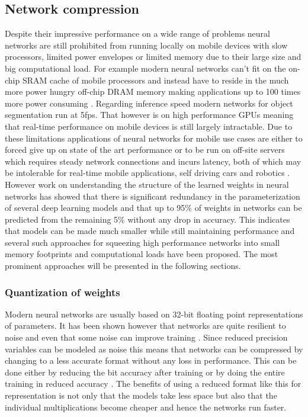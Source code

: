 \documentclass{kththesis}
\newcommand{\bibentry}[1]{\parencite{#1}}
\begin{document}
  \subsection{Network compression}
Despite their impressive performance on a wide range of problems neural networks
are still prohibited from running locally on mobile devices with slow
processors, limited power envelopes or limited memory due to their large size
and big computational load. For example modern neural networks can't fit on the
on-chip SRAM cache of mobile processors and instead have to reside in the much more power hungry
off-chip DRAM memory making applications up to 100 times more power consuming
\bibentry{han2015learning}. Regarding inference speed modern networks
for object segmentation \bibentry{he2017mask} run at 5fps. That however is on high
performance GPUs meaning that real-time performance on mobile devices is still
largely intractable. Due to
these limitations applications of neural networks for mobile use cases are
either to forced give up on state of the art performance or to be run on
off-site servers which requires steady network connections and incurs latency,
both of which may be intolerable for real-time mobile applications, self driving
cars and robotics \bibentry{jin2014flattened}. However work on understanding the
structure of the learned weights in neural networks
\bibentry{denil2013predicting} has showed that there is significant redundancy
in the parameterization of several deep learning models and that up to 95\% of
weights in networks can be predicted from the remaining 5\% without any drop in
accuracy. This indicates that models can be made much smaller while still
maintaining performance and several such approaches for squeezing high
performance networks into small memory footprints and computational loads have
been proposed. The most prominent approaches will be presented in the following
sections.  

\subsubsection{Quantization of weights}
Modern neural networks are usually based on 32-bit floating point
representations of parameters. It has been shown however that networks are quite
resilient to noise and even that some noise can improve training
\bibentry{murray1994enhanced}. Since reduced precision variables can be modeled
as noise this means that networks can be compressed by changing to a less
accurate format without any loss in performance. This can be done either by
reducing the bit accuracy after training \bibentry{vanhoucke2011improving}  or
by doing the entire training in reduced accuracy \bibentry{hubara2016quantized}
\bibentry{gupta2015deep}. The benefits of using a reduced format like this for
representation is not only that the models take less space but also that the
individual multiplications become cheaper and hence the networks run faster. 
\end{document}
